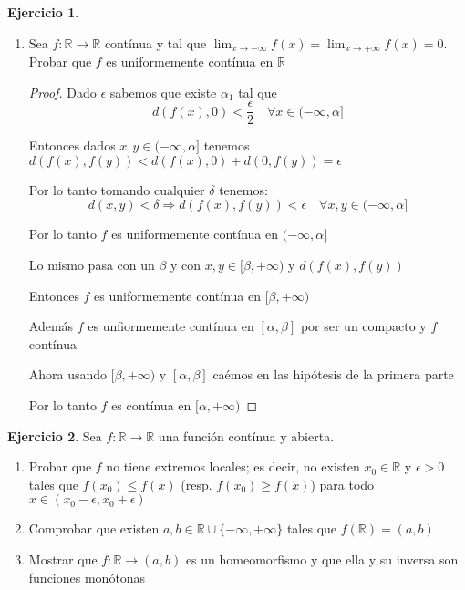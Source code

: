\documentclass[11pt]{report}
\newcommand{\R}{\mathbb{R}}
\newcommand{\Ra}{\Rightarrow}
\newcommand{\ra}{\rightarrow}
\theoremstyle{definition}
\newtheorem{ej}{Ejercicio}
\begin{document}
\begin{ej}
\begin{enumerate}
\begin{proof}
					$$ |x+y | < \delta \Ra |\sqrt{x} + \sqrt{y}| < \epsilon$$
				\end{proof}

			\item Sea $f : \R \ra \R$ contínua y tal que $\lim_{x \ra - \infty} f(x) = \lim_{x \ra + \infty} f(x) = 0$. Probar que $f$ es uniformemente contínua en $\R$
				\begin{proof}
					Dado $\epsilon$ sabemos que existe $\alpha_1$ tal que $$d(f(x),0) < \frac{\epsilon}{2} \quad \forall x \in (-\infty,\alpha] $$

					Entonces dados $x,y \in (-\infty,\alpha] $ tenemos $d(f(x),f(y)) < d(f(x),0) + d(0,f(y)) = \epsilon$

					Por lo tanto tomando cualquier $\delta$ tenemos: 
					$$d(x,y) < \delta \Ra d(f(x),f(y)) < \epsilon \quad \forall x,y \in (-\infty,\alpha] $$

					Por lo tanto $f$ es uniformemente contínua en $(-\infty,\alpha]$

					Lo mismo pasa con un $\beta$ y con $x,y \in [\beta,+\infty)$ y $d(f(x),f(y))$

					Entonces $f$ es uniformemente contínua en $[\beta,+\infty)$

					Además $f$ es unfiormemente contínua en $[\alpha,\beta]$ por ser un compacto y $f$ contínua 

					Ahora usando $[\beta,+\infty)$ y $[\alpha,\beta]$ caémos en las hipótesis de la primera parte

					Por lo tanto $f$ es contínua en $[\alpha,+\infty)$
				\end{proof}
				
				
		\end{enumerate}
	\end{ej}
	
	\begin{ej}
		Sea $f : \R \ra \R$ una función contínua y abierta.
		\begin{enumerate}
			\item Probar que $f$ no tiene extremos locales; es decir, no existen $x_0 \in \R$ y $\epsilon > 0$ tales que $f(x_0) \leq f(x)$ (resp. $f(x_0) \geq f(x)$) para todo $x \in (x_0 - \epsilon,x_0 + \epsilon)$

			\item Comprobar que existen $a,b \in \R \cup \{-\infty,+\infty\}$ tales que $f(\R) = (a,b)$
			\item Mostrar que $f: \R \ra (a,b)$ es un homeomorfismo y que ella y su inversa son funciones monótonas
		\end{enumerate}
	\end{ej}
	
	
	
		
\end{document}
